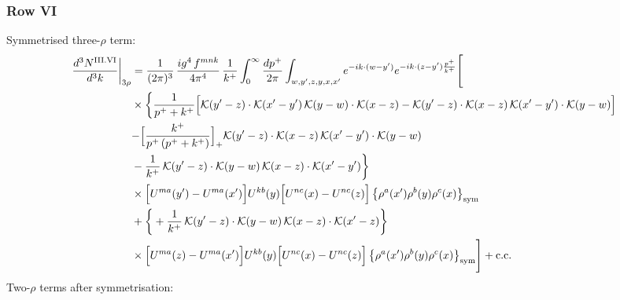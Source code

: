 \documentclass[9pt]{article}
\numberwithin{equation}{section}
\begin{document}
\subsubsection*{Row VI}
Symmetrised three-$\rho$ term:
\begin{align}
\frac{d^{3}N^{\rm III.VI}}{d^{3}k}\bigg|_{3\rho}&=\frac{1}{(2\pi)^{3}}\,\frac{ig^{4}\,f^{mnk}}{4\pi^{4}}\,\frac{1}{k^{+}}\int_{0}^{\infty}\frac{dp^{+}}{2\pi}\int_{w,y',z,y,x,x'}e^{-ik\cdot{(w-y')}}e^{-ik\cdot{(z-y')}\frac{p^{+}}{k^{+}}}\Bigg[\notag\\
&\times\bigg\{\frac{1}{p^{+}+k^{+}}\Big[\mathcal{K}(y'-z)\cdot\mathcal{K}(x'-y')\,\mathcal{K}(y-w)\cdot\mathcal{K}(x-z)-\mathcal{K}(y'-z)\cdot\mathcal{K}(x-z)\,\mathcal{K}(x'-y')\cdot\mathcal{K}(y-w)\Big]\notag\\
&{-\Big[\frac{k^{+}}{p^{+}\,(p^{+}+k^{+})}\Big]_{+}\mathcal{K}(y'-z)\cdot\mathcal{K}(x-z)\,\mathcal{K}(x'-y')\cdot\mathcal{K}(y-w)}\notag\\
&-\frac{1}{k^{+}}\,\mathcal{K}(y'-z)\cdot\mathcal{K}(y-w)\,\mathcal{K}(x-z)\cdot\mathcal{K}(x'-y')\bigg\}\notag\\
&\times \Big[U^{ma}(y')-U^{ma}(x')\Big]U^{kb}(y)\Big[U^{nc}(x)-U^{nc}(z)\Big]\,\big\{\rho^{a}(x')\rho^{b}(y)\rho^{c}(x)\big\}_{\rm sym}\notag\\
&+\bigg\{+\frac{1}{k^{+}}\,\mathcal{K}(y'-z)\cdot\mathcal{K}(y-w)\,\mathcal{K}(x-z)\cdot\mathcal{K}(x'-z)\bigg\}\notag\\
&\times \Big[U^{ma}(z)-U^{ma}(x')\Big]U^{kb}(y)\Big[U^{nc}(x)-U^{nc}(z)\Big]\,\big\{\rho^{a}(x')\rho^{b}(y)\rho^{c}(x)\big\}_{\rm sym}\Bigg]+{\rm c.c.}\label{eq:D-III.VI-3}
\end{align}
Two-$\rho$ terms after symmetrisation:
\end{document}
